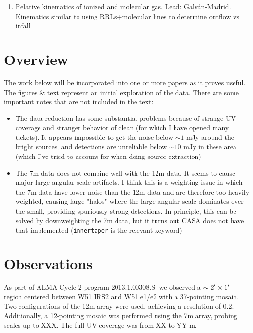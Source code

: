 \documentclass{aa}
\begin{document}
\begin{enumerate}
        plentiful.  It is not obvious whether they can or should be
        incorporated into this paper; at least, I am not presently prepared to
        put in the effort to quantify the outflows properly.  Ciriaco is PI of
        a long-baseline program that has resolved the e2/e8 and North cores
        with $5\times$ better resolution than this program, and that data set
        may therefore be better suited to a core-outflow association work.
    \item Relative kinematics of ionized and molecular gas.  Lead: Galv{\'a}n-Madrid.
        Kinematics similar to \citet{Keto2008a} using RRLs+molecular lines to determine
        outflow vs infall
        
\end{enumerate}


\section{Overview}
The work below will be incorporated into one or more papers as it proves useful.
The figures \& text represent an initial exploration of the data.  There are some important notes
that are not included in the text:
\begin{itemize}
    \item The data reduction has some substantial problems because of strange UV coverage
        and stranger behavior of clean (for which I have opened many tickets).  It appears
        impossible to get the noise below $\sim1 $ mJy around the bright sources, and detections
        are unreliable below $\sim10$ mJy in these area (which I've tried to account for when doing
        source extraction)
    \item The 7m data does not combine well with the 12m data.  It seems to
        cause major large-angular-scale artifacts.  I think this is a weighting
        issue in which the 7m data have lower noise than the 12m data and are
        therefore too heavily weighted, causing large "halos" where the large
        angular scale dominates over the small, providing spuriously strong
        detections.  In principle, this can be solved by downweighting the 7m data,
        but it turns out CASA does not have that implemented (\texttt{innertaper}
        is the relevant keyword)

\end{itemize}


\section{Observations}
As part of ALMA Cycle 2 program 2013.1.00308.S, we observed a
$\sim2\mbox{$^\prime$}\times1\mbox{$^\prime$}$ region centered between W51 IRS2 and W51 e1/e2
with a 37-pointing mosaic.  Two configurations of the 12m array were used,
achieving a resolution of 0.2\arcsec.  Additionally, a 12-pointing mosaic was
performed using the 7m array, probing scales up to XXX\arcsec.  The full UV
coverage was from XX to YY m.
\end{document}
